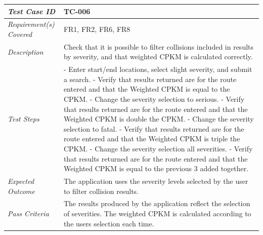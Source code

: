 \documentclass[authoryearcitations]{UoYCSproject}
\begin{document}
\begin{tabular}{| p{2.5cm} | p{11cm} |}
	\hline
	\textit{Test Case ID} & TC-006 \\ \hline
	\textit{Requirement(s) Covered} & FR1, FR2, FR6, FR8 \\ \hline
	\textit{Description} & Check that it is possible to filter collisions included in results by severity, and that weighted CPKM is calculated correctly. \\ \hline
	\textit{Test Steps}& - Enter start/end locations, select slight severity, and submit a search.
	\newline - Verify that results returned are for the route entered and that the Weighted CPKM is equal to the CPKM.
	\newline - Change the severity selection to serious.
	\newline - Verify that results returned are for the route entered and that the Weighted CPKM is double the CPKM.
	\newline - Change the severity selection to fatal.
	\newline - Verify that results returned are for the route entered and that the Weighted CPKM is triple the CPKM.
	\newline - Change the severity selection all severities.
	\newline - Verify that results returned are for the route entered and that the Weighted CPKM is equal to the previous 3 added together.
 \\ \hline
	\textit{Expected Outcome} & The application uses the severity levels selected by the user to filter collision results.  \\ \hline
	\textit{Pass Criteria} & The results produced by the application reflect the selection of severities. The weighted CPKM is calculated according to the users selection each time. \\ \hline
\end{tabular}
\end{document}

